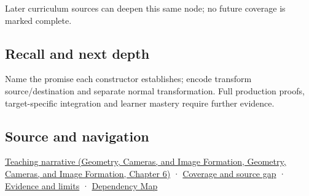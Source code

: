 Later curriculum sources can deepen this same node; no future coverage is marked complete.

\subsection{Recall and next depth}\label{appendix-380a220e2529-recall-and-next-depth}

Name the promise each constructor establishes; encode transform source/destination and separate normal transformation. Full production proofs, target-specific integration and learner mastery require further evidence.

\subsection{Source and navigation}\label{appendix-380a220e2529-source-and-navigation}

\href{../03-Geometry-Cameras-and-Image-Formation/main.pdf\#nameddest=02-foundations-ii-ch037-types-can-remember-the-promises-that-three-components-forget}{Teaching narrative (Geometry, Cameras, and Image Formation, Geometry, Cameras, and Image Formation, Chapter 6)} · \hyperref[appendix-fd090d982a15-phase-6---parts-501-600]{Coverage and source gap} · \hyperref[appendix-a103e7846d21-phase-6---source-analysis-and-verification]{Evidence and limits} · \hyperref[appendix-4ad47bdd269a]{Dependency Map}

